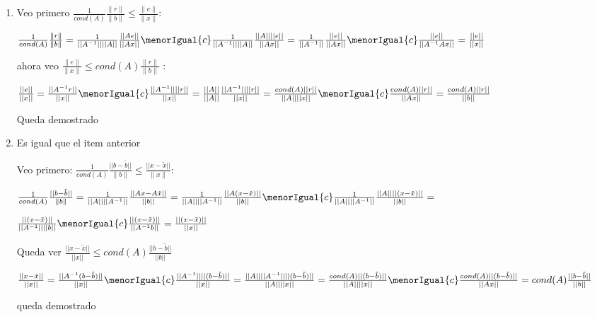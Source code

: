 \begin{enumerate}[label=(\alph*)]
    \item 
    Veo primero 
    $\frac{1}{cond(A)} \frac{\|r\|}{\|b\|} \leq \frac{\|e\|}{\|x\|}$:

    $\frac{1}{cond(A)} \frac{\|r\|}{\|b\|} = 
    \frac{1}{||A^{-1}|| ||A||} \frac{||A e||}{||A x||} \menorIgual{c}
    \frac{1}{||A^{-1}|| ||A||} \frac{||A|| ||e||}{||Ax||} =
    \frac{1}{||A^{-1}|| } \frac{||e||}{||Ax||} \menorIgual{c}
    \frac{||e||}{||A^{-1} Ax|| } = 
    \frac{||e||}{||x||}
    $ 

    ahora veo 
    $  \frac{\|e\|}{\|x\|} \leq  cond(A)  \frac{\|r\|}{\|b\|}$ :

    $\frac{||e||}{||x||} = 
     \frac{||A^{-1} r||}{||x||} \menorIgual{c}
     \frac{||A^{-1}|| ||r||}{||x||} =
     \frac{||A||}{||A||} \frac{||A^{-1}|| ||r||}{||x||} = 
     \frac{cond(A) ||r||}{||A|| ||x||} \menorIgual{c}
     \frac{cond(A) ||r||}{||A x||} =
     \frac{cond(A) ||r||}{||b||}
    $

    Queda demostrado
    \item Es igual que el item anterior 
    
    Veo primero: 
    $\frac{1}{cond(A)}  \frac{||b - \tilde{b}||}{\|b\|} \leq \frac{||x - \tilde{x}||}{\|x\|}$:

    $\frac{1}{cond(A)}  \frac{||b - \tilde{b}||}{\|b\|} =
     \frac{1}{||A|| ||A^{-1}||} \frac{||Ax - A\tilde{x}||}{||b||} =
     \frac{1}{||A|| ||A^{-1}||} \frac{||A(x - \tilde{x})||}{||b||} \menorIgual{c}
     \frac{1}{||A|| ||A^{-1}||} \frac{||A|| ||(x - \tilde{x})||}{||b||} =
    $

    $
    \frac{||(x - \tilde{x})||}{||A^{-1}|| ||b||} \menorIgual{c}
    \frac{||(x - \tilde{x})||}{||A^{-1} b||} = 
    \frac{||(x - \tilde{x})||}{||x||} 
    $

    Queda ver $\frac{||x - \tilde{x}||}{||x||} \leq cond(A)  \frac{||b - \tilde{b}||}{||b||}$

    $
    \frac{||x - \tilde{x}||}{||x||} =
    \frac{||A^{-1}(b - \tilde{b})||}{||x||} \menorIgual{c}
    \frac{||A^{-1}|| ||(b - \tilde{b})||}{||x||} = 
    \frac{||A|| ||A^{-1}|| ||(b - \tilde{b})||}{||A|| ||x||} =
    \frac{cond(A) ||(b - \tilde{b})||}{||A|| ||x||} \menorIgual{c}
    \frac{cond(A) ||(b - \tilde{b})||}{||Ax||} =
    cond(A)  \frac{||b - \tilde{b}||}{||b||}
    $
    
    queda demostrado
\end{enumerate}


\begin{aportes}
    \item {}
\end{aportes}